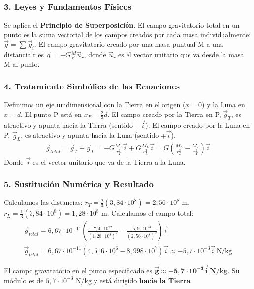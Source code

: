 \subsubsection*{3. Leyes y Fundamentos Físicos}
Se aplica el \textbf{Principio de Superposición}. El campo gravitatorio total en un punto es la suma vectorial de los campos creados por cada masa individualmente: $\vec{g} = \sum \vec{g}_i$.
El campo gravitatorio creado por una masa puntual M a una distancia r es $\vec{g} = -G \frac{M}{r^2} \vec{u}_r$, donde $\vec{u}_r$ es el vector unitario que va desde la masa M al punto.

\subsubsection*{4. Tratamiento Simbólico de las Ecuaciones}
Definimos un eje unidimensional con la Tierra en el origen ($x=0$) y la Luna en $x=d$. El punto P está en $x_P = \frac{2}{3}d$.
El campo creado por la Tierra en P, $\vec{g}_T$, es atractivo y apunta hacia la Tierra (sentido $-\vec{i}$). El campo creado por la Luna en P, $\vec{g}_L$, es atractivo y apunta hacia la Luna (sentido $+\vec{i}$).
\begin{gather}
    \vec{g}_{total} = \vec{g}_T + \vec{g}_L = -G\frac{M_T}{r_T^2}\vec{i} + G\frac{M_L}{r_L^2}\vec{i} = G\left( \frac{M_L}{r_L^2} - \frac{M_T}{r_T^2} \right) \vec{i}
\end{gather}
Donde $\vec{i}$ es el vector unitario que va de la Tierra a la Luna.

\subsubsection*{5. Sustitución Numérica y Resultado}
Calculamos las distancias:
$r_T = \frac{2}{3}(3,84 \cdot 10^8) = 2,56 \cdot 10^8$ m.
$r_L = \frac{1}{3}(3,84 \cdot 10^8) = 1,28 \cdot 10^8$ m.
Calculamos el campo total:
\begin{gather}
    \vec{g}_{total} = 6,67 \cdot 10^{-11} \left( \frac{7,4 \cdot 10^{22}}{(1,28 \cdot 10^8)^2} - \frac{5,9 \cdot 10^{24}}{(2,56 \cdot 10^8)^2} \right) \vec{i} \nonumber \\
    \vec{g}_{total} = 6,67 \cdot 10^{-11} (4,516 \cdot 10^6 - 8,998 \cdot 10^7) \vec{i} \approx -5,7 \cdot 10^{-3} \vec{i} \, \text{N/kg}
\end{gather}
\begin{cajaresultado}
    El campo gravitatorio en el punto especificado es $\boldsymbol{\vec{g} \approx -5,7 \cdot 10^{-3} \vec{i} \, \textbf{N/kg}}$. Su módulo es de $5,7 \cdot 10^{-3}$ N/kg y está dirigido \textbf{hacia la Tierra}.
\end{cajaresultado}

